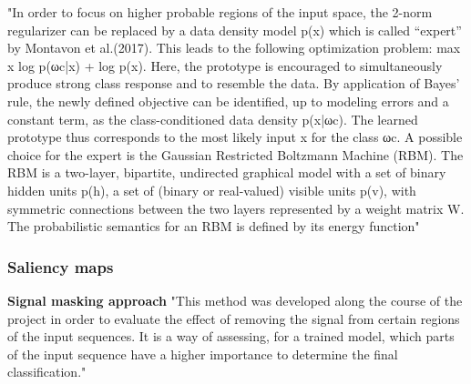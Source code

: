 	
		"In order to focus on higher probable regions of the input space, the 2-norm regularizer can be replaced by a data density model p(x) which is called “expert” by Montavon et al.(2017). This leads to the following optimization problem:
		max x log p(ωc|x) + log p(x).
		Here, the prototype is encouraged to simultaneously produce strong class response and to  resemble  the  data.   By  application  of  Bayes’  rule,  the  newly  defined  objective  can  be identified, up to modeling errors and a constant term, as the class-conditioned data density p(x|ωc).  The learned prototype thus corresponds to the most likely input x for the class ωc.  A possible choice for the expert is the Gaussian Restricted Boltzmann Machine (RBM).
		The RBM is a two-layer, bipartite, undirected graphical model with a set of binary hidden units p(h), a set of (binary or real-valued) visible units p(v), with symmetric connections between the two layers represented by a weight matrix W.  The probabilistic semantics for an RBM is defined by its energy function" \cite{Montavon2018}
		
		
	
		\subsubsection{Saliency maps}
		\textbf{Signal masking approach}
		"This method was developed along the course of the project in order to evaluate the effect of removing the signal from certain regions of the input sequences. It is a way of assessing, for a trained model, which parts of the input sequence have a higher importance to determine the final classification." \cite{Fontal2017}
		
